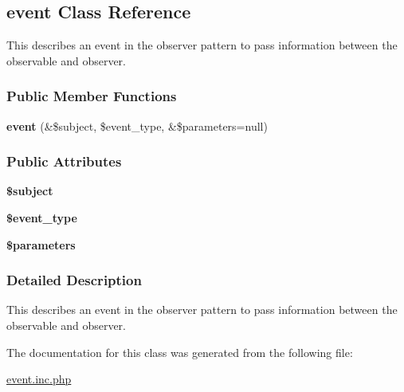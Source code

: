 \hypertarget{classevent}{\subsection{event Class Reference}
\label{classevent}
}


This describes an event in the observer pattern to pass information between the observable and observer.  


\subsubsection*{Public Member Functions}
\begin{DoxyCompactItemize}
\item 
\hypertarget{classevent_aef1a1991f2fdcbcfdba51b88e63a86fb}{{\bfseries event} (\&\$subject, \$event\-\_\-type, \&\$parameters=null)}\label{classevent_aef1a1991f2fdcbcfdba51b88e63a86fb}

\end{DoxyCompactItemize}
\subsubsection*{Public Attributes}
\begin{DoxyCompactItemize}
\item 
\hypertarget{classevent_a06fb7639aadb82d77ab0bee2cbdddcf7}{{\bfseries \$subject}}\label{classevent_a06fb7639aadb82d77ab0bee2cbdddcf7}

\item 
\hypertarget{classevent_ac6fc9038510c56f7d6c5c57d248b70db}{{\bfseries \$event\-\_\-type}}\label{classevent_ac6fc9038510c56f7d6c5c57d248b70db}

\item 
\hypertarget{classevent_a0759049c8b1681ce7337109ca9eac02d}{{\bfseries \$parameters}}\label{classevent_a0759049c8b1681ce7337109ca9eac02d}

\end{DoxyCompactItemize}


\subsubsection{Detailed Description}
This describes an event in the observer pattern to pass information between the observable and observer. 

The documentation for this class was generated from the following file\-:\begin{DoxyCompactItemize}
\item 
\hyperlink{event_8inc_8php}{event.\-inc.\-php}\end{DoxyCompactItemize}
